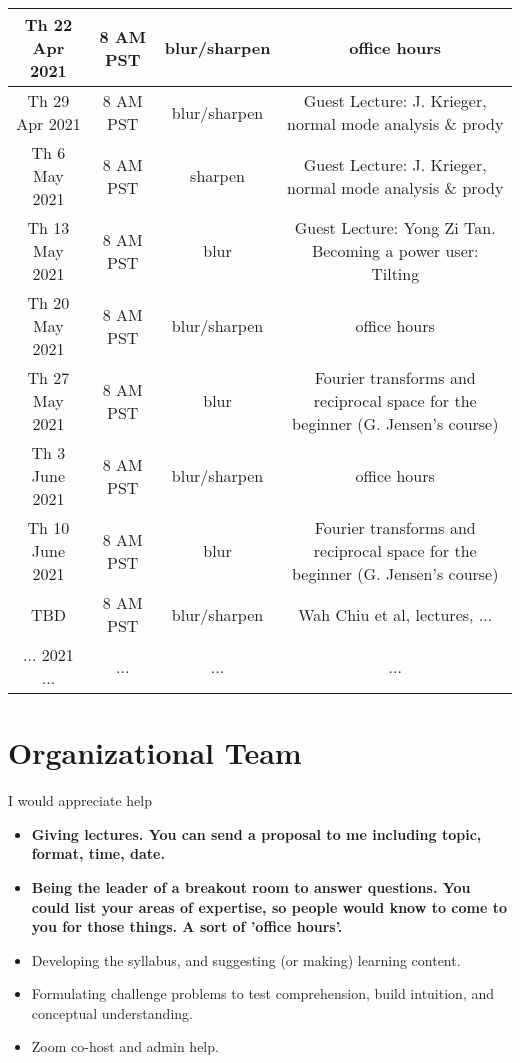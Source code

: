 \documentclass[11pt, oneside]{article}   	%
\begin{document}
\begin{center}
\begin{tabular}{|| c c c c||}
 \hline
Th 22 Apr 2021 & \tiny{8 AM PST} & blur/sharpen & office hours  \\ 
 \hline
Th 29 Apr 2021 & \tiny{8 AM PST} & blur/sharpen & \tiny{Guest Lecture: J. Krieger, normal mode analysis \& prody}  \\ 
 \hline
Th 6 May 2021 & \tiny{8 AM PST} & sharpen & \tiny{Guest Lecture: J. Krieger, normal mode analysis \& prody} \\ 
 \hline
Th 13 May 2021 & \tiny{8 AM PST} & blur & \tiny{Guest Lecture: Yong Zi Tan. Becoming a power user: Tilting}  \\ 
 \hline
Th 20 May 2021 & \tiny{8 AM PST} & blur/sharpen & office hours  \\ 
 \hline
Th 27 May 2021 & \tiny{8 AM PST} & blur & \tiny{Fourier transforms and reciprocal space for the beginner (G. Jensen's course)}  \\ 
 \hline
Th 3 June 2021 & \tiny{8 AM PST} & blur/sharpen & office hours  \\ 
 \hline
Th 10 June 2021 & \tiny{8 AM PST} & blur & \tiny{Fourier transforms and reciprocal space for the beginner (G. Jensen's course)}  \\
 \hline
TBD & \tiny{8 AM PST} & blur/sharpen & Wah Chiu et al, lectures, ...  \\ [1ex] 
 \hline
 ... 2021 ... & ... &  ... & ...  \\ 
 \hline
\end{tabular}
\end{center}

\section{Organizational Team}

I would appreciate help 
\begin{itemize}
	\item {\bf Giving lectures. You can send a proposal to me including topic, format, time, date.}
	\item {\bf Being the leader of a breakout room to answer questions. You could list your areas of expertise, so people would know to come to you for those things. A sort of 'office hours'.}
	\item Developing the syllabus, and suggesting (or making) learning content.
	\item Formulating challenge problems to test comprehension, build intuition, and conceptual understanding.
	\item Zoom co-host and admin help.
\end{itemize}
\end{document}
